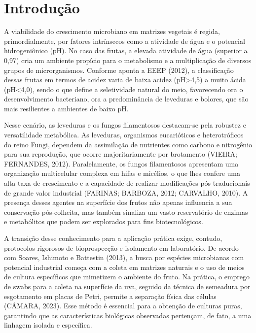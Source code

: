 
\section{Introdução}

A viabilidade do crescimento microbiano em matrizes vegetais é regida, primordialmente, por fatores intrínsecos como a atividade de água e o potencial hidrogeniônico (pH). No caso das frutas, a elevada atividade de água (superior a 0,97) cria um ambiente propício para o metabolismo e a multiplicação de diversos grupos de microrganismos. Conforme aponta a EEEP (2012), a classificação dessas frutas em termos de acidez varia de baixa acidez (pH>4,5) a muito ácida (pH<4,0), sendo o que define a seletividade natural do meio, favorecendo ora o desenvolvimento bacteriano, ora a predominância de leveduras e bolores, que são mais resilientes a ambientes de baixo pH.

Nesse cenário, as leveduras e os fungos filamentosos destacam-se pela robustez e versatilidade metabólica. As leveduras, organismos eucarióticos e heterotróficos do reino Fungi, dependem da assimilação de nutrientes como carbono e nitrogênio para sua reprodução, que ocorre majoritariamente por brotamento (VIEIRA; FERNANDES, 2012). Paralelamente, os fungos filamentosos apresentam uma organização multicelular complexa em hifas e micélios, o que lhes confere uma alta taxa de crescimento e a capacidade de realizar modificações pós-traducionais de grande valor industrial (FARINAS; BARBOZA, 2012; CARVALHO, 2010). A presença desses agentes na superfície dos frutos não apenas influencia a sua conservação pós-colheita, mas também sinaliza um vasto reservatório de enzimas e metabólitos que podem ser explorados para fins biotecnológicos.

A transição desse conhecimento para a aplicação prática exige, contudo, protocolos rigorosos de bioprospecção e isolamento em laboratório. De acordo com Soares, Ishimoto e Battestin (2013), a busca por espécies microbianas com potencial industrial começa com a coleta em matrizes naturais e o uso de meios de cultura específicos que mimetizem o ambiente do fruto. Na prática, o emprego de swabs para a coleta na superfície da uva, seguido da técnica de semeadura por esgotamento em placas de Petri, permite a separação física das células (CÂMARA, 2023). Esse método é essencial para a obtenção de culturas puras, garantindo que as características biológicas observadas pertençam, de fato, a uma linhagem isolada e específica.

